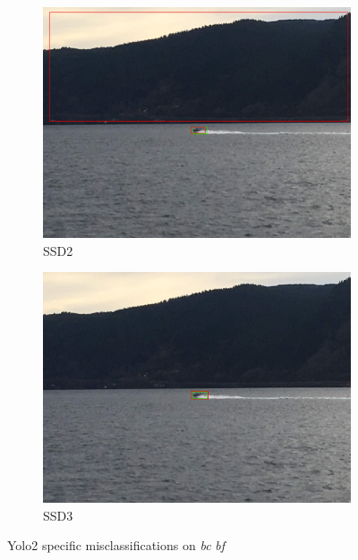 \begin{figure}[h!]
\begin{subfigure}{.5\textwidth}
  \centering
  \includegraphics[width=0.75\linewidth]{results/case_buildings/ssdtrf/ssd2/grov2/IMG_2325.jpg}
  \caption{SSD2}
\end{subfigure}%
\begin{subfigure}{.5\textwidth}
  \centering
  \includegraphics[width=.75\linewidth]{results/case_buildings/ssdtrf/ssd3/grov2/IMG_2325.jpg}
  \caption{SSD3}
\end{subfigure}
\caption{Yolo2 specific misclassifications on \textit{bc} \textit{bf}}
\label{img:yolo2_misclas}


\end{figure}
